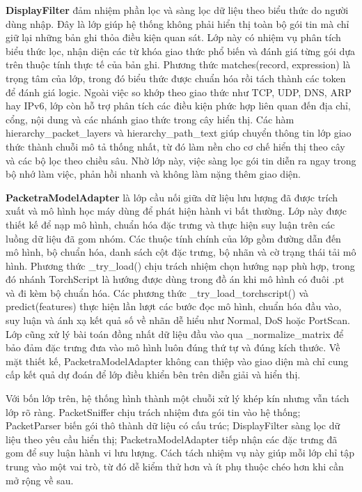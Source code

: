 \documentclass[../DoAn.tex]{subfiles}
\begin{document}
\textbf{DisplayFilter} đảm nhiệm phần lọc và sàng lọc dữ liệu theo biểu thức do người dùng nhập. Đây là lớp giúp hệ thống không phải hiển thị toàn bộ gói tin mà chỉ giữ lại những bản ghi thỏa điều kiện quan sát. Lớp này có nhiệm vụ phân tích biểu thức lọc, nhận diện các từ khóa giao thức phổ biến và đánh giá từng gói dựa trên thuộc tính thực tế của bản ghi. Phương thức matches(record, expression) là trọng tâm của lớp, trong đó biểu thức được chuẩn hóa rồi tách thành các token để đánh giá logic. Ngoài việc so khớp theo giao thức như TCP, UDP, DNS, ARP hay IPv6, lớp còn hỗ trợ phân tích các điều kiện phức hợp liên quan đến địa chỉ, cổng, nội dung và các nhánh giao thức trong cây hiển thị. Các hàm hierarchy\_packet\_layers và hierarchy\_path\_text giúp chuyển thông tin lớp giao thức thành chuỗi mô tả thống nhất, từ đó làm nền cho cơ chế hiển thị theo cây và các bộ lọc theo chiều sâu. Nhờ lớp này, việc sàng lọc gói tin diễn ra ngay trong bộ nhớ làm việc, phản hồi nhanh và không làm nặng thêm giao diện.

\textbf{PacketraModelAdapter} là lớp cầu nối giữa dữ liệu lưu lượng đã được trích xuất và mô hình học máy dùng để phát hiện hành vi bất thường. Lớp này được thiết kế để nạp mô hình, chuẩn hóa đặc trưng và thực hiện suy luận trên các luồng dữ liệu đã gom nhóm. Các thuộc tính chính của lớp gồm đường dẫn đến mô hình, bộ chuẩn hóa, danh sách cột đặc trưng, bộ nhãn và cờ trạng thái tải mô hình. Phương thức \_try\_load() chịu trách nhiệm chọn hướng nạp phù hợp, trong đó nhánh TorchScript là hướng được dùng trong đồ án khi mô hình có đuôi .pt và đi kèm bộ chuẩn hóa. Các phương thức \_try\_load\_torchscript() và predict(features) thực hiện lần lượt các bước đọc mô hình, chuẩn hóa đầu vào, suy luận và ánh xạ kết quả số về nhãn dễ hiểu như Normal, DoS hoặc PortScan. Lớp cũng xử lý bài toán đồng nhất dữ liệu đầu vào qua \_normalize\_matrix để bảo đảm đặc trưng đưa vào mô hình luôn đúng thứ tự và đúng kích thước. Về mặt thiết kế, PacketraModelAdapter không can thiệp vào giao diện mà chỉ cung cấp kết quả dự đoán để lớp điều khiển bên trên diễn giải và hiển thị.

Với bốn lớp trên, hệ thống hình thành một chuỗi xử lý khép kín nhưng vẫn tách lớp rõ ràng. PacketSniffer chịu trách nhiệm đưa gói tin vào hệ thống; PacketParser biến gói thô thành dữ liệu có cấu trúc; DisplayFilter sàng lọc dữ liệu theo yêu cầu hiển thị; PacketraModelAdapter tiếp nhận các đặc trưng đã gom để suy luận hành vi lưu lượng. Cách tách nhiệm vụ này giúp mỗi lớp chỉ tập trung vào một vai trò, từ đó dễ kiểm thử hơn và ít phụ thuộc chéo hơn khi cần mở rộng về sau.
\end{document}

